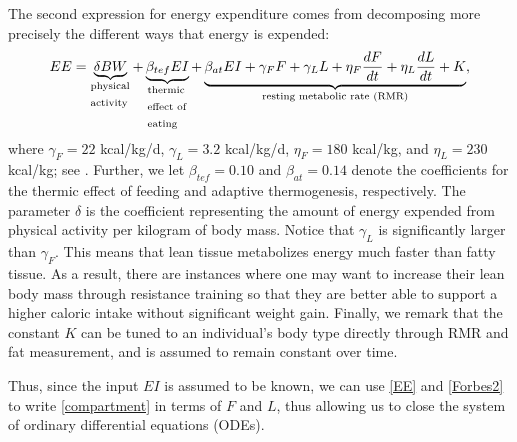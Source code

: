 The second expression for energy expenditure comes from decomposing more precisely the different ways that energy is expended:
\begin{equation}
\label{EE}
EE = \underbrace{\delta BW}_\text{\parbox{1cm}{physical\\activity}} + \underbrace{\beta_{tef} EI}_\text{\parbox{1cm}{thermic\\effect of\\eating}} + \underbrace{\beta_{at} EI + \gamma_F F + \gamma_L L + \eta_F \dfrac{dF}{dt} + \eta_L \dfrac{dL}{dt}  + K}_\text{resting metabolic rate (RMR)},
\end{equation}
where $\gamma_F = 22$ kcal/kg/d, $\gamma_L = 3.2$ kcal/kg/d, $\eta_F = 180$ kcal/kg, and $\eta_L = 230$ kcal/kg; see \cite{Hall.2, Hall.4}.  Further, we let $\beta_{tef}=0.10$ and $\beta_{at}=0.14$ denote the coefficients for the thermic effect of feeding and adaptive thermogenesis, respectively.  The parameter $\delta$ is the coefficient representing the amount of energy expended from physical activity per kilogram of body mass.  Notice that $\gamma_L$ is significantly larger than $\gamma_F$.  This means that lean tissue metabolizes energy much faster than fatty tissue.  As a result, there are instances where one may want to increase their lean body mass through resistance training so that they are better able to support a higher caloric intake without significant weight gain.  Finally, we remark that the constant $K$ can be tuned to an individual's body type directly through RMR and fat measurement, and is assumed to remain constant over time.


Thus, since the input $EI$ is assumed to be known, we can use \eqref{EE} and \eqref{Forbes2} to write \eqref{compartment} in terms of $F$ and $L$, thus allowing us to close the system of ordinary differential equations (ODEs).  

